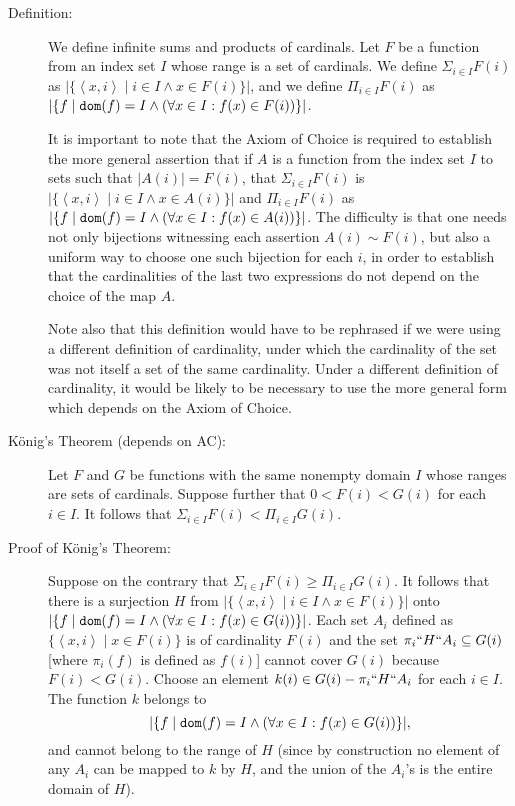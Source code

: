 \documentclass[12pt]{book}
\begin{document}
\begin{description}

\item[Definition:]  We define infinite sums and products of cardinals.  Let $F$ be a function from an index set $I$ whose range is a set of cardinals.  We define $\Sigma_{i \in I} F(i)$ as
$|\{\left<x,i\right> \mid i \in I \wedge x \in F(i)\}|$, and we define $\Pi_{i \in I} F(i)$ as $|\{f \mid {\tt dom}(f) = I \wedge (\forall x \in I:f(x) \in F(i))\}|$.  

It is important to note that the Axiom of Choice is required to establish the more general assertion that if $A$ is a function from the index set $I$ to sets such that $|A(i)| = F(i)$, that  $\Sigma_{i \in I} F(i)$ is 
$|\{\left<x,i\right> \mid i \in I \wedge x \in A(i)\}|$ and $\Pi_{i \in I} F(i)$ as $|\{f \mid {\tt dom}(f) = I \wedge (\forall x \in I:f(x) \in A(i))\}|$.   The difficulty is that one needs not only bijections witnessing each assertion $A(i) \sim F(i)$, but also a uniform way to choose one such bijection for each $i$, in order to establish that the cardinalities of the last two expressions do not depend on the choice of the map $A$. 

Note also that this definition would have to be rephrased if we were using a different definition of cardinality, under which the cardinality of the set was not itself a set of the same cardinality.  Under a different definition of cardinality, it would be likely to be necessary to use the more general form which depends on the Axiom of Choice.

\item[K\"onig's Theorem (depends on AC):]  Let $F$ and $G$ be functions with the same nonempty domain $I$ whose ranges are sets of cardinals.
Suppose further that $0<F(i) < G(i)$ for each $i \in I$.  It follows that $\Sigma_{i\in I}F(i) < \Pi_{i \in I} G(i)$.

\item[Proof of K\"onig's Theorem:]  Suppose on the contrary that $\Sigma_{i\in I}F(i) \geq \Pi_{i \in I} G(i)$.  It follows that there is a surjection
$H$ from $|\{\left<x,i\right> \mid i \in I \wedge x \in F(i)\}|$ onto $|\{f \mid {\tt dom}(f) = I \wedge (\forall x \in I:f(x) \in G(i))\}|$.  Each set
$A_i$ defined as $\{\left<x,i\right> \mid x \in F(i)\}$ is of cardinality $F(i)$ and the set $\pi_i``H``A_i\subseteq G(i)$ [where $\pi_i(f)$ is defined as $f(i)$] cannot cover $G(i)$ because $F(i) < G(i)$.  Choose an element $k(i) \in G(i) - \pi_i``H``A_i$ for each $i \in I$.  The function $k$ belongs to $$|\{f \mid {\tt dom}(f) = I \wedge (\forall x \in I:f(x) \in G(i))\}|,$$ and cannot belong to the range of $H$ (since by construction no element of any $A_i$ can be mapped to $k$ by $H$, and the union of the $A_i$'s is the entire domain of $H$).


\end{description}
\end{document}
